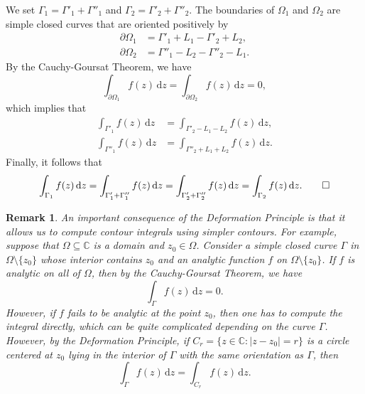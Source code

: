 \documentclass[10pt]{article}
\makeatletter
\newcommand{\C}{\mathbb{C}}
\newcommand{\dd}{\,\mathrm{d}}
\theoremstyle{newstyle}
\newtheorem{remark}[thm]{Remark}
\newenvironment{pf}[1][\proofname]{\par
  \pushQED{\qed}%
  \normalfont \topsep0\p@\relax
  \trivlist
  \item[\hskip\labelsep\scshape
  #1\@addpunct{.}]\ignorespaces
}{%
  \popQED\endtrivlist\@endpefalse
}
\makeatother
\begin{document}
\begin{pf}
\begin{center}
\end{center}

We set $\Gamma_1 = \Gamma'_1 + \Gamma''_1$ and $\Gamma_2 = \Gamma'_2 + \Gamma''_2$. 
The boundaries of $\Omega_1$ and $\Omega_2$ are simple closed curves that are oriented 
positively by 
\begin{align*}
    \partial\Omega_1 &= \Gamma'_1 + L_1 - \Gamma'_2 + L_2, \\
    \partial\Omega_2 &= \Gamma''_1 - L_2 - \Gamma''_2 - L_1. 
\end{align*}
By the Cauchy-Goursat Theorem, we have 
\[ \int_{\partial\Omega_1} f(z)\dd z = \int_{\partial\Omega_2} f(z)\dd z = 0, \]
which implies that 
\begin{align*}
    \int_{\Gamma'_1} f(z)\dd z &= \int_{\Gamma'_2 - L_1 - L_2} f(z) \dd z, \\
    \int_{\Gamma''_1} f(z) \dd z &= \int_{\Gamma''_2 + L_1 + L_2} f(z) \dd z.
\end{align*}
Finally, it follows that 
\[ \int_{\Gamma_1} f(z)\dd z = \int_{\Gamma'_1 + \Gamma''_1} f(z)\dd z = 
\int_{\Gamma'_2 + \Gamma''_2} f(z)\dd z = \int_{\Gamma_2} f(z)\dd z. \qedhere \]
\end{pf}

\begin{remark}
An important consequence of the Deformation Principle is that it allows us to compute contour 
integrals using simpler contours. For example, suppose that $\Omega \subseteq \C$ 
is a domain and $z_0 \in \Omega$. Consider a simple closed curve $\Gamma$ in $\Omega 
\setminus \{z_0\}$ whose interior contains $z_0$ and an analytic function $f$ on 
$\Omega \setminus \{z_0\}$. If $f$ is analytic on all of $\Omega$, then by the Cauchy-Goursat 
Theorem, we have 
\[ \int_\Gamma f(z)\dd z = 0. \]
However, if $f$ fails to be analytic at the point $z_0$, then one has to compute the 
integral directly, which can be quite complicated depending on the curve $\Gamma$. 
However, by the Deformation Principle, if $C_r = \{z \in \C : |z-z_0| = r\}$ is a 
circle centered at $z_0$ lying in the interior of $\Gamma$ with the 
same orientation as $\Gamma$, then 
\[ \int_\Gamma f(z)\dd z = \int_{C_r} f(z)\dd z. \]
\end{remark}
\end{document}
